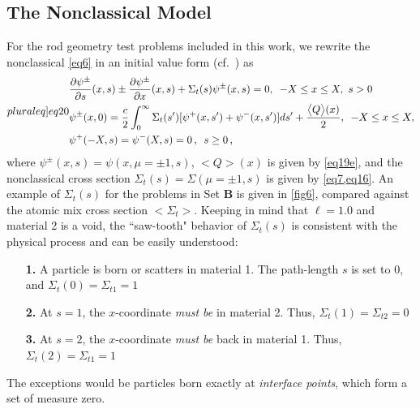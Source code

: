 \documentclass[12pt]{article}
\newcommand{\bl}{\big<}
\newcommand{\bg}{\big>}
\begin{document}
\subsection{The Nonclassical Model}

For the rod geometry test problems included in this work, we rewrite the nonclassical \cref{eq6} in an initial value form (cf.\ \cite{vaslar14a}) as
\begin{subequations}\label[pluraleq]{eq20}
\begin{align}
&\frac{\partial\psi^{\pm}}{\partial s}(x,s) \pm \frac{\partial \psi^{\pm}}{\partial x}(x,s) + \Sigma_t(s)\psi^{\pm}(x,s)  = 0,\,\,\, -X\leq x\leq X,\,\, s>0 \label{eq20a}\\
& \psi^{\pm}(x,0)= \frac{c}{2} \int_0^\infty \Sigma_t(s')[\psi^{+}(x,s')+\psi^{-}(x,s')]ds' + \frac{\bl Q\bg(x)}{2}, \,\,\, -X\leq x\leq X,\label{eq20b}\\
& \psi^+(-X,s) = \psi^-(X,s) = 0\,,\,\,\, s\geq 0\,,
\end{align}
\end{subequations}
where $\psi^{\pm}(x,s) = \psi(x,\mu=\pm 1, s)$, $\bl Q\bg(x)$ is given by \cref{eq19e}, and the nonclassical cross section $\Sigma_t(s)=\Sigma(\mu=\pm 1,s)$ is given by \cref{eq7,eq16}. An example of $\Sigma_t(s)$ for the problems in Set \textbf{B} is given in \cref{fig6}, compared against the atomic mix cross section $\bl\Sigma_t\bg$. Keeping in mind that $\ell=1.0$ and material 2 is a void, the ``saw-tooth" behavior of $\Sigma_t(s)$ is consistent with the physical process and can be easily understood:
\begin{itemize}
\item[\textbf{1.}] A particle is born or scatters in material 1. The path-length $s$ is set to 0, and $\Sigma_t(0) = \Sigma_{t1} = 1$\vspace{-8pt}
\item[\textbf{2.}] At $s=1$, the $x$-coordinate {\em must be} in material 2. Thus, $\Sigma_t(1) = \Sigma_{t2} = 0$\vspace{-8pt}
\item[\textbf{3.}] At $s=2$, the $x$-coordinate {\em must be} back in material 1. Thus, $\Sigma_t(2) = \Sigma_{t1} = 1$\vspace{-8pt}
\end{itemize}
The exceptions would be particles born exactly at {\em interface points}, which form a set of measure zero.
\end{document}
